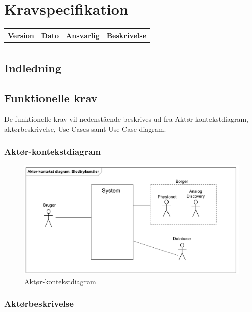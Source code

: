 \chapter{Kravspecifikation}

\begin{longtabu} to 
    Version &    Dato &    Ansvarlig &    Beskrivelse\\[-1ex]
    \midrule

\label{version_Systemark}
\end{longtabu}


\section{Indledning}



\section{Funktionelle krav}
De funktionelle krav vil nedenstående beskrives ud fra Aktør-kontekstdiagram, aktørbeskrivelse, Use Cases samt Use Case diagram. 

\subsection{Aktør-kontekstdiagram}
\begin{figure}[H]
	\centering
	\includegraphics[width=1\textwidth]{Figurer/Snip20150929_7}
	\caption{Aktør-kontekstdiagram}
	\label{fig:aktoerbeskrivelse}
\end{figure}



\subsection{Aktørbeskrivelse}

